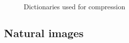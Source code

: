 \begin{figure}[h]
\centering
{}
\hspace{5mm}\label{fig:naturalDict}
\label{fig:sketchDict}
\caption{Dictionaries used for compression}
\label{fig:compressionDicts}
\end{figure}




\subsection{Natural images}

